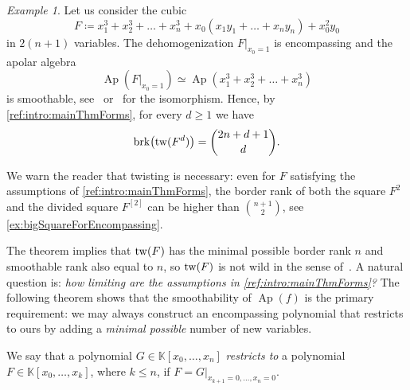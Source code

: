 \documentclass[a4paper,11pt,reqno]{amsart}
\newcommand{\bbK}{\mathbb{K}}
\DeclareMathOperator{\Ap}{Ap}
\DeclareMathOperator{\brk}{brk}
\numberwithin{equation}{section}
\theoremstyle{definition}
\theoremstyle{plain}
\theoremstyle{remark}
\newtheorem{exam}[defn]{Example}
\begin{document}
\begin{exam}\label{ex:cubics}
    Let us consider the cubic
    \[F \coloneq x_1^3 + x_2^3 +  \dots + x_n^3 + x_{0}\left( x_1y_1 +  \dots +
    x_ny_n \right) + x_0^2y_0\] in $2(n+1)$ variables. The
    dehomogenization $F|_{x_0 = 1}$ is encompassing and the apolar algebra
    \[\Ap(F|_{x_0=1})  \simeq \Ap(x_1^3 + x_2^3 +  \ldots + x_n^3)\] is
    smoothable, see~\cite[Theorem~3.3]{EliasRossiShortGorenstein} or~\cite[Example~2.16]{Jel17} for the isomorphism. Hence, by
    \autoref{ref:intro:mainThmForms}, for every $d\geq 1$ we have
\[
    \brk\bigl(\twist{F^d}\bigr)=\binom{2n+d+1}{d}.
\]

\end{exam}
We warn the reader that twisting is necessary: even for $F$ satisfying the
assumptions of \autoref{ref:intro:mainThmForms}, the border rank of {both the square} $F^2$ and {the divided square}
$F^{[2]}$ can be higher than $\binom{n+1}{2}$, see
\autoref{ex:bigSquareForEncompassing}.

The theorem implies that $\mathrm{tw}(F)$ has the minimal possible border
rank $n$ and smoothable rank also equal to $n$, so $\mathrm{tw}(F)$ is not wild in the
sense of~\cite{BB15}.
A natural question is: \emph{how limiting are the assumptions in
    \autoref{ref:intro:mainThmForms}?} The following theorem shows that the
    smoothability of $\Ap(f)$ is the primary requirement: {we may always construct an encompassing polynomial that restricts to ours by adding a \emph{minimal possible} number of new variables.}

We say that a polynomial $G\in \bbK[x_0, \ldots ,x_n]$ \emph{restricts to} a
polynomial $F\in \bbK[x_0, \ldots ,x_k]$, where $k\leq n$, if $F =
G|_{x_{k+1} =0, \ldots ,x_n=0}$.
\end{document}
